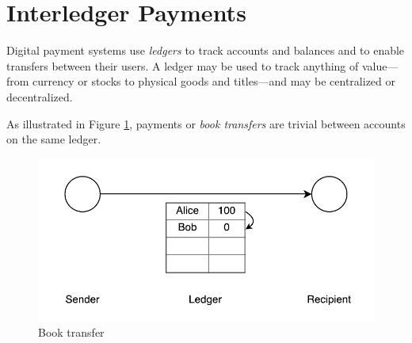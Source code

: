 \documentclass[letterpaper,twocolumn,10pt]{article}
\begin{document}
\section{Interledger Payments}
\label{sec:model}

                 
Digital payment systems use \textit{ledgers} to track accounts and balances and to enable transfers between their users. A ledger may be used to track anything of value---from currency or stocks to physical goods and titles---and may be centralized or decentralized. \cite{Bitcoin}

As illustrated in Figure \ref{fig:three-bells}, payments or \textit{book transfers} are trivial between accounts on the same ledger.

\begin{figure}[ht]
    \centering
    \includegraphics[width=\columnwidth]{figures/three-bells.pdf}
    \caption{Book transfer}
    \label{fig:three-bells}
\end{figure}


\end{document}
